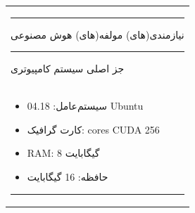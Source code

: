 \documentclass[a4paper,10pt]{article}
\begin{document}
\begin{table}[htbp]
\begin{tabularx}{\textwidth}{ X }
                    \vspace{3pt}

                    \hrule

                    \vspace{3pt}

                    نیازمندی(های) مولفه(های) هوش مصنوعی

                    \vspace{3pt}

                    \hrule

                    \vspace{3pt}

                    جز اصلی سیستم کامپیوتری \\

                    \vspace{-10pt}

                    \begin{itemize}
                        
                        \item سیستم‌عامل: 04.18 Ubuntu
                        
                        \item کارت گرافیک: cores CUDA 256
                        
                        \item RAM: 8 گیگابایت
                        
                        \item حافظه: 16 گیگابایت

                    \end{itemize}

                    \hrule

                \end{tabularx}

            \end{table}
\end{document}
